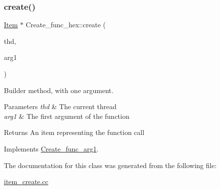\subsubsection{\texorpdfstring{create()}{create()}}
{\footnotesize\ttfamily \mbox{\hyperlink{classItem}{Item}} $\ast$ Create\+\_\+func\+\_\+hex\+::create (\begin{DoxyParamCaption}\item[{T\+HD $\ast$}]{thd,  }\item[{\mbox{\hyperlink{classItem}{Item}} $\ast$}]{arg1 }\end{DoxyParamCaption})\hspace{0.3cm}{\ttfamily [virtual]}}

Builder method, with one argument. 
\begin{DoxyParams}{Parameters}
{\em thd} & The current thread \\
\hline
{\em arg1} & The first argument of the function \\
\hline
\end{DoxyParams}
\begin{DoxyReturn}{Returns}
An item representing the function call 
\end{DoxyReturn}


Implements \mbox{\hyperlink{classCreate__func__arg1_a3e9a98f755cd82c3e762e334c955a8c9}{Create\+\_\+func\+\_\+arg1}}.



The documentation for this class was generated from the following file\+:\begin{DoxyCompactItemize}
\item 
\mbox{\hyperlink{item__create_8cc}{item\+\_\+create.\+cc}}\end{DoxyCompactItemize}
